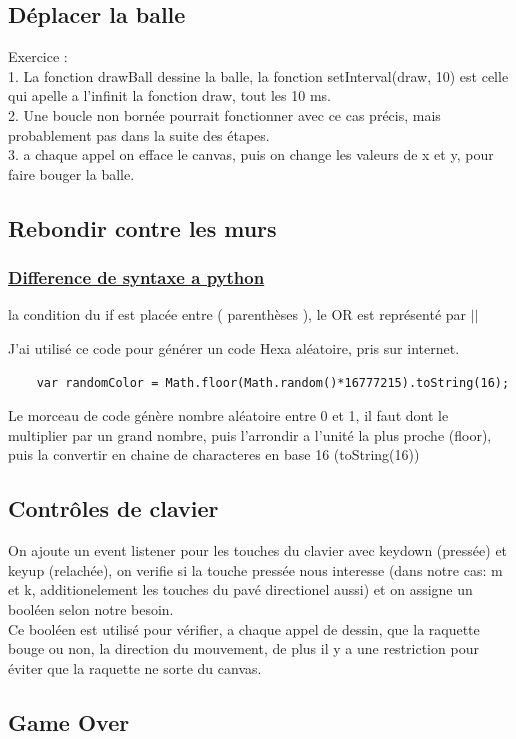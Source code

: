 \documentclass[12pt]{exam}
\begin{document}
\subsection{Déplacer la balle}

Exercice :\\
1. La fonction drawBall dessine la balle, la fonction setInterval(draw, 10) est celle qui apelle a l'infinit la fonction draw, tout les 10 ms.\\
2. Une boucle non bornée pourrait fonctionner avec ce cas précis, mais probablement pas dans la suite des étapes.\\
3. a chaque appel on efface le canvas, puis on change les valeurs de x et y, pour faire bouger la balle.

\subsection{Rebondir contre les murs}
\subsubsection*{\underline{Difference de syntaxe a python}}
la condition du if est placée entre ( parenthèses ), le OR est représenté par $\vert \vert$

J'ai utilisé ce code pour générer un code Hexa aléatoire, pris sur internet.
\begin{verbatim}
    var randomColor = Math.floor(Math.random()*16777215).toString(16);
\end{verbatim}
Le morceau de code génère nombre aléatoire entre 0 et 1, il faut dont le multiplier par un grand nombre, puis l'arrondir a l'unité la plus proche (floor), puis la convertir en chaine de characteres en base 16 (toString(16))

\subsection{Contrôles de clavier}
On ajoute un event listener pour les touches du clavier avec keydown (pressée) et keyup (relachée), on verifie si la touche pressée nous interesse (dans notre cas: m et k, additionelement les touches du pavé directionel aussi) et on assigne un booléen selon notre besoin.\\
Ce booléen est utilisé pour vérifier, a chaque appel de dessin, que la raquette bouge ou non, la direction du mouvement, de plus il y a une restriction pour éviter que la raquette ne sorte du canvas.
 
\subsection{Game Over}
\end{document}
